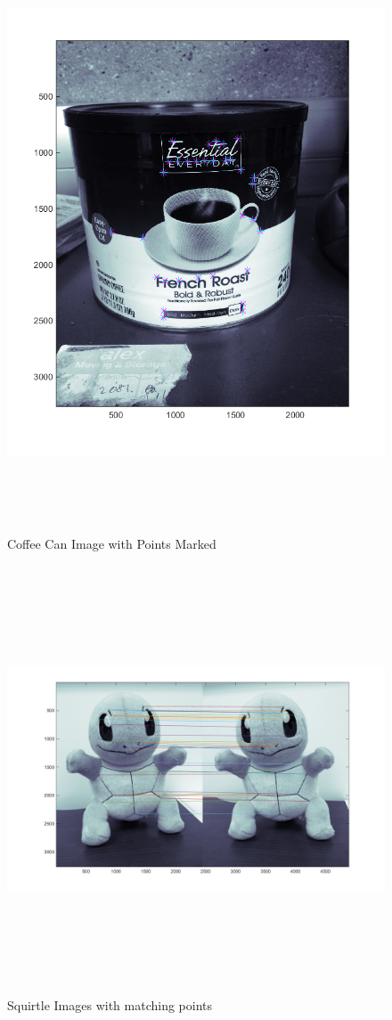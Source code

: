 \documentclass[11pt,psfig]{article}
\begin{document}
\begin{figure}[H]
\centering
\includegraphics[height=7in]{coffeeCan_prob2Points.png}
\caption{Coffee Can Image with Points Marked}
\label{p2c}
\end{figure}

\begin{figure}[H]
\centering
\includegraphics[height=5in]{squirtle_prob2Matches.png}
\caption{Squirtle Images with matching points}
\label{p2d}
\end{figure}
\end{document}
